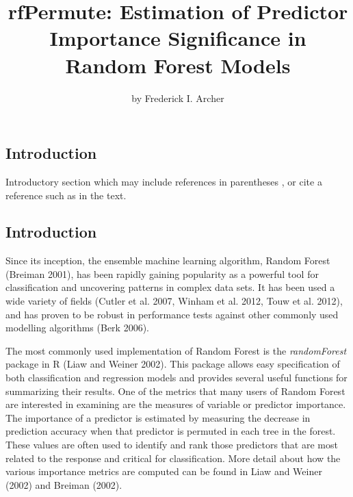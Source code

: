 \title{rfPermute: Estimation of Predictor Importance Significance in Random
Forest Models}
\author{by Frederick I. Archer}

\maketitle


\subsection{Introduction}\label{introduction}

Introductory section which may include references in parentheses
\citep{R}, or cite a reference such as \citet{R} in the text.

\subsection{Introduction}\label{introduction-1}

Since its inception, the ensemble machine learning algorithm, Random
Forest (Breiman 2001), has been rapidly gaining popularity as a powerful
tool for classification and uncovering patterns in complex data sets. It
has been used a wide variety of fields (Cutler et al. 2007, Winham et
al. 2012, Touw et al. 2012), and has proven to be robust in performance
tests against other commonly used modelling algorithms (Berk 2006).

The most commonly used implementation of Random Forest is the
\emph{randomForest} package in R (Liaw and Weiner 2002). This package
allows easy specification of both classification and regression models
and provides several useful functions for summarizing their results. One
of the metrics that many users of Random Forest are interested in
examining are the measures of variable or predictor importance. The
importance of a predictor is estimated by measuring the decrease in
prediction accuracy when that predictor is permuted in each tree in the
forest. These values are often used to identify and rank those
predictors that are most related to the response and critical for
classification. More detail about how the various importance metrics are
computed can be found in Liaw and Weiner (2002) and Breiman (2002).

